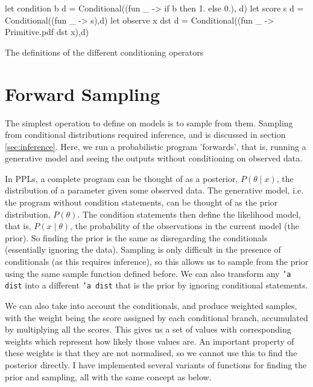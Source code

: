 \begin{listing}[!htb]
	\centering
\begin{ocamlcode-in}
let condition b d = Conditional((fun _ -> if b then 1. else 0.), d)
let score s d = Conditional((fun _ -> s),d)
let observe x dst d = Conditional((fun _ -> Primitive.pdf dst x),d) 
\end{ocamlcode-in}	
	\caption{The definitions of the different conditioning operators}
	\label{lst:cond}
\end{listing}

\section{Forward Sampling}
The simplest operation to define on models is to sample from them. Sampling from conditional distributions required inference, and is discussed in section \ref{sec:inference}. Here, we run a probabilistic program 'forwards', that is, running a generative model and seeing the outputs without conditioning on observed data.
	
In PPLs, a complete program can be thought of as a posterior, $P(\theta\mid x)$, the distribution of a parameter given some observed data. The generative model, i.e. the program without condition statements, can be thought of as the prior distribution, $P(\theta)$. The condition statements then define the likelihood model, that is, $P(x\mid \theta)$, the probability of the observations in the current model (the prior). So finding the prior is the same as disregarding the conditionals (essentially ignoring the data). Sampling is only difficult in the presence of conditionals (as this requires inference), so this allows us to sample from the prior using the same sample function defined before. We can also transform any \texttt{'a dist} into a different \texttt{'a dist} that is the prior by ignoring conditional statements.
	
We can also take into account the conditionals, and produce weighted samples, with the weight being the score assigned by each conditional branch, accumulated by multiplying all the scores. This gives us a set of values with corresponding weights which represent how likely those values are. An important property of these weights is that they are not normalised, so we cannot use this to find the posterior directly. I have implemented several variants of functions for finding the prior and sampling, all with the same concept as below.

